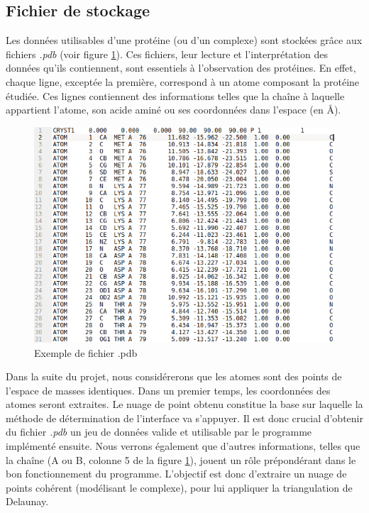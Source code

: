 \subsection*{Fichier de stockage}

Les données utilisables d'une protéine (ou d'un complexe) sont stockées grâce aux
fichiers \textit{.pdb} (voir figure \ref{fig::pdb_file}). Ces fichiers, leur lecture et l'interprétation des données
qu'ils contiennent, sont essentiels à l'observation des protéines. En effet, chaque
ligne, exceptée la première, correspond à un atome composant la protéine étudiée.
Ces lignes contiennent des informations telles que la chaîne à laquelle appartient
l'atome, son acide aminé ou ses coordonnées dans l'espace (en $\si{\angstrom}$).

\begin{figure}[ht]
  \includegraphics[width=\textwidth]{figures/pdb_example.png}
  \caption{Exemple de fichier .pdb}
  \label{fig::pdb_file}
\end{figure}

Dans la suite du projet, nous considérerons que les atomes sont des points de l'espace
de masses identiques. Dans un premier temps, les coordonnées des atomes seront extraites.
Le nuage de point obtenu constitue la base sur laquelle la méthode de détermination
de l'interface va s'appuyer. Il est donc crucial d'obtenir du fichier \textit{.pdb} un jeu
de données valide et utilisable par le programme implémenté ensuite. Nous verrons également
que d'autres informations, telles que la chaîne (A ou B, colonne 5 de la figure
\ref{fig::pdb_file}), jouent un rôle prépondérant dans le bon fonctionnement du
programme. L'objectif est donc d'extraire un nuage de points cohérent (modélisant
le complexe), pour lui appliquer la triangulation de Delaunay.



